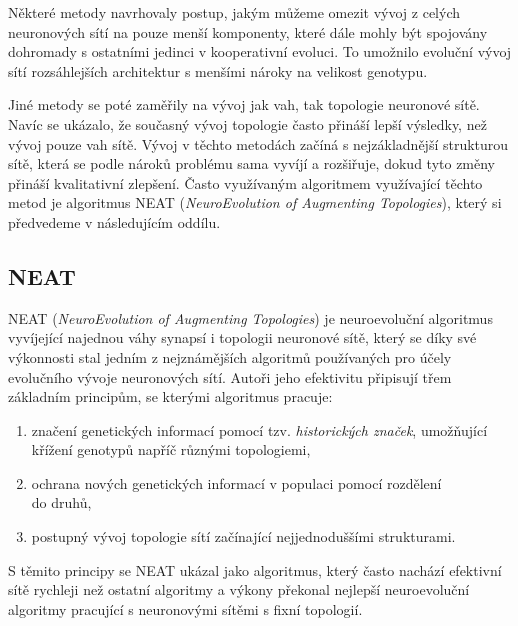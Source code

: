 Některé metody \citet{gomez2008accelerated} navrhovaly postup, jakým můžeme
omezit vývoj z celých neuronových sítí na pouze menší komponenty, které dále
mohly být spojovány dohromady s ostatními jedinci v kooperativní evoluci. To
umožnilo evoluční vývoj sítí rozsáhlejších architektur s menšími nároky na
velikost genotypu.

Jiné metody se poté zaměřily na vývoj jak vah, tak topologie neuronové sítě.
Navíc se ukázalo, že současný vývoj topologie často přináší lepší výsledky, než
vývoj pouze vah sítě. Vývoj v těchto metodách začíná s nejzákladnější
strukturou sítě, která se podle nároků problému sama vyvíjí a rozšiřuje, dokud
tyto změny přináší kvalitativní zlepšení. Často využívaným algoritmem
využívající těchto metod je algoritmus NEAT (\emph{NeuroEvolution of Augmenting
Topologies}), který si předvedeme v následujícím oddílu.

\subsection{NEAT} \label{NN - NEAT}
NEAT (\emph{NeuroEvolution of Augmenting Topologies})
\citep{stanley2002evolving} je neuroevoluční algoritmus vyvíjející najednou
váhy synapsí i topologii neuronové sítě, který se díky své výkonnosti stal
jedním z nejznámějších algoritmů používaných pro účely evolučního vývoje
neuronových sítí. Autoři jeho efektivitu připisují třem základním principům, se
kterými algoritmus pracuje:
\begin{enumerate}
    \item značení genetických informací pomocí tzv. \emph{historických značek},
        umožňující křížení genotypů napříč různými topologiemi,
   \item ochrana nových genetických informací v populaci pomocí rozdělení\\
       do druhů,
    \item postupný vývoj topologie sítí začínající nejjednoduššími strukturami.
\end{enumerate}
S těmito principy se NEAT ukázal jako algoritmus, který často nachází efektivní
sítě rychleji než ostatní algoritmy a výkony překonal nejlepší neuroevoluční
algoritmy pracující s neuronovými sítěmi s fixní topologií.

